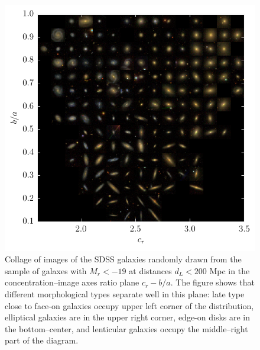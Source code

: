 \begin{figure}[!th]
\centerline{
\includegraphics[scale=1.4]{fig/crab_collage.pdf}}
\vspace{-5mm}
\caption{Collage of images of the SDSS galaxies randomly drawn from the sample of galaxes with $M_r<-19$ at distances $d_L<200$ Mpc in the concentration--image axes ratio plane $c_r-b/a$. The figure shows that different morphological types separate well in this plane: late type close to face-on galaxies occupy upper left corner of the distribution, elliptical galaxies are in the upper right corner, edge-on disks are in the bottom--center, and lenticular galaxies occupy the middle--right part of the diagram.\label{fig:crba_collage}}
\end{figure}



